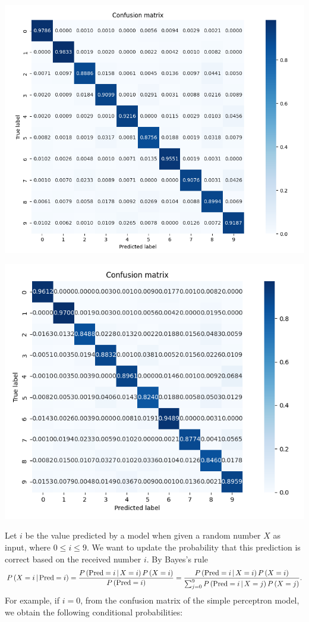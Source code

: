 \documentclass[11pt]{amsart}
\begin{document}
\hspace{-0.3in}
\begin{minipage}{0.5\linewidth}
\includegraphics[width = \linewidth]{Confusion_matrix3.png}
\end{minipage}
\begin{minipage}{0.5\linewidth}
\includegraphics[width = \linewidth]{Confusion_matrix4.png}
\end{minipage}
\medskip

Let $i$ be the value predicted by a model when given a random number $X$ as input, where $0\leq i\leq 9$. We want to update the probability that this prediction is correct based on the received number $i$. By Bayes's rule
$$
P\left(X=i\,|\, {\rm Pred}=i\right)=\frac{P\left({\rm Pred}=i\,|\, X=i\right)P\left(X=i\right)}{P\left({\rm Pred}=i\right)}
=\frac{P\left({\rm Pred}=i\,|\, X=i\right)P\left(X=i\right)}{\sum_{j=0}^9P\left({\rm Pred}=i\,|\,X=j\right)P\left(X=j\right)}.
$$
For example, if $i=0$, from the confusion matrix of the simple perceptron model, we obtain the following conditional probabilities:
\medskip
\end{document}
